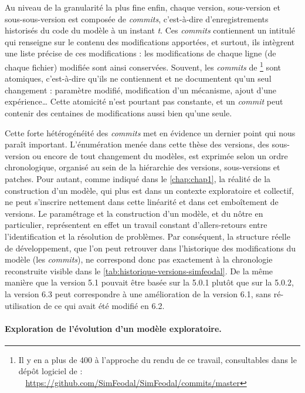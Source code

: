 Au niveau de la granularité la plus fine enfin, chaque version, sous-version et sous-sous-version est composée de \og \textit{commits}\fg{}, c'est-à-dire d'enregistrements historisés du code du modèle à un instant \textit{t}.
Ces \textit{commits} contiennent un intitulé qui renseigne sur le contenu des modifications apportées, et surtout, ils intègrent une liste précise de ces modifications : les modifications de chaque ligne (de chaque fichier) modifiée sont ainsi conservées.
Souvent, les \textit{commits} de \simfeodal{} \footnote{
	Il y en a plus de 400 à l'approche du rendu de ce travail, consultables dans le dépôt logiciel de \simfeodal{} :\\
	\faGithub~ \href{https://github.com/SimFeodal/SimFeodal/commits/master}{https://github.com/SimFeodal/SimFeodal/commits/master}
} sont \og atomiques\fg{}, c'est-à-dire qu'ils ne contiennent et ne documentent qu'un seul changement : paramètre modifié, modification d'un mécanisme, ajout d'une expérience\ldots
Cette atomicité n'est pourtant pas constante, et un \textit{commit} peut contenir des centaines de modifications aussi bien qu'une seule.

Cette forte hétérogénéité des \textit{commits} met en évidence un dernier point qui nous paraît important.
L'énumération menée dans cette thèse des versions, des sous-version ou encore de tout changement du modèles, est exprimée selon un ordre chronologique, organisé au sein de la hiérarchie des versions, sous-versions et patches.
Pour autant, comme indiqué dans le \cref{chap:chap1}, la réalité de la construction d'un modèle, qui plus est dans un contexte exploratoire et collectif, ne peut s'inscrire nettement dans cette linéarité et dans cet emboîtement de versions.
Le paramétrage et la construction d'un modèle, et du nôtre en particulier, représentent en effet un travail constant d'allers-retours entre l'identification et la résolution de problèmes.
Par conséquent, la structure réelle de développement, que l'on peut retrouver dans l'historique des modifications du modèle (les \og \textit{commits}\fg{}), ne correspond donc pas exactement à la chronologie reconstruite visible dans le \cref{tab:historique-versions-simfeodal}.
De la même manière que la version 5.1 pouvait être basée sur la 5.0.1 plutôt que sur la 5.0.2, la version 6.3 peut correspondre à une amélioration de la version 6.1, sans ré-utilisation de ce qui avait été modifié en 6.2.

\paragraph{Exploration de l'évolution d'un modèle exploratoire.}


